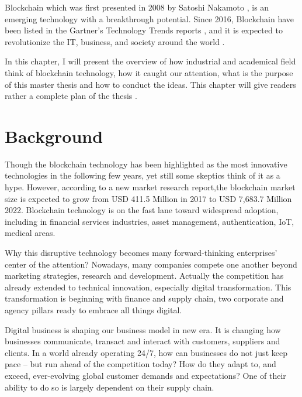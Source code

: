 Blockchain which was first presented in 2008 by Satoshi Nakamoto \cite{sn}, is an emerging technology with a breakthrough potential. Since 2016, Blockchain have been listed in the Gartner’s Technology Trends reports \cite{c-1}, and it is expected to revolutionize the IT, business, and society around the world \cite{c-Deloi}.

In this chapter, I will present the overview of how industrial and academical field think of blockchain technology, how it caught our attention, what is the purpose of this master thesis and how to conduct the ideas. This chapter will give readers rather a complete plan of the thesis .\\

\section{Background}
Though the blockchain technology has been highlighted as the most innovative technologies in the following few years, yet still some skeptics think of it as a hype. However, according to a new market research report,the blockchain market size is expected to grow from USD 411.5 Million in 2017 to USD 7,683.7 Million 2022. Blockchain technology is on the fast lane toward widespread adoption, including in financial services industries, asset management, authentication, IoT, medical areas.

Why this disruptive technology becomes many forward-thinking enterprises' center of the attention? Nowadays, many companies compete one another beyond marketing strategies, research and development. Actually the competition has already extended to technical innovation, especially digital transformation. This transformation is beginning with finance and supply chain, two corporate and agency pillars ready to embrace all things digital. 

Digital business is shaping our business model in new era. It is changing how businesses communicate, transact and interact with customers, suppliers and clients. In a world already operating 24/7, how can businesses do not just keep pace – but run ahead of the competition today? How do they adapt to, and exceed, ever-evolving global customer demands and expectations? One of their ability to do so is largely dependent on their supply chain.

